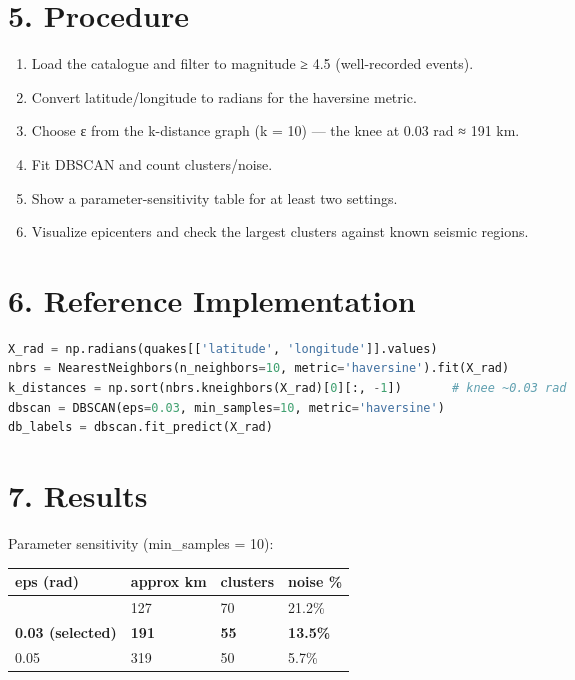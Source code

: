 \section{5. Procedure}\label{procedure}

\begin{enumerate}
\def\labelenumi{\arabic{enumi}.}
\tightlist
\item
  Load the catalogue and filter to magnitude ≥ 4.5 (well-recorded
  events).
\item
  Convert latitude/longitude to radians for the haversine metric.
\item
  Choose ε from the k-distance graph (k = 10) --- the knee at 0.03 rad ≈
  191 km.
\item
  Fit DBSCAN and count clusters/noise.
\item
  Show a parameter-sensitivity table for at least two settings.
\item
  Visualize epicenters and check the largest clusters against known
  seismic regions.
\end{enumerate}

\section{6. Reference Implementation}\label{reference-implementation}

\begin{lstlisting}[language=Python]
X_rad = np.radians(quakes[['latitude', 'longitude']].values)
nbrs = NearestNeighbors(n_neighbors=10, metric='haversine').fit(X_rad)
k_distances = np.sort(nbrs.kneighbors(X_rad)[0][:, -1])       # knee ~0.03 rad
dbscan = DBSCAN(eps=0.03, min_samples=10, metric='haversine')
db_labels = dbscan.fit_predict(X_rad)
\end{lstlisting}

\section{7. Results}\label{results}

Parameter sensitivity (min\_samples = 10):

{\def\LTcaptype{none} %
\begin{longtable}[]{@{}llll@{}}
\toprule\noalign{}
eps (rad) & approx km & clusters & noise \% \\
\midrule\noalign{}
\endhead
\bottomrule\noalign{}
\endlastfoot
0.02 & 127 & 70 & 21.2\% \\
\textbf{0.03 (selected)} & \textbf{191} & \textbf{55} &
\textbf{13.5\%} \\
0.05 & 319 & 50 & 5.7\% \\
\end{longtable}
}

